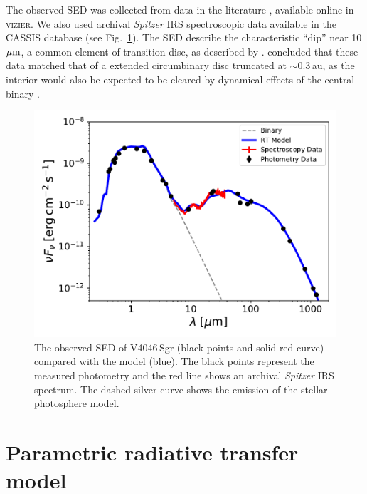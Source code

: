 \documentclass[fleqn,usenatbib,useAMS]{mnras}
\begin{document}
The observed SED was collected from data in the literature \citep{1988iras....7.....H, 1990A&A...234..230H, Jensen_97, 2000A&A...355L..27H, 2001KFNT...17..409K, 2003yCat.2246....0C, 2007PASJ...59S.369M, 2008PASP..120.1128O, 2010A&A...514A...1I, 2012yCat.2311....0C}, available online in \textsc{vizier}. We also used archival \textit{Spitzer} IRS spectroscopic data available in the CASSIS database \citep{Lebouteiller_2015} (see Fig.~\ref{fig:SED}). The SED describe the characteristic “dip” near 10 $\hbox{$\mu$m}$, a common element of transition disc, as described by \citet{Rosenfeld_2013}. \citet{Jensen_97} concluded that these data matched that of a extended circumbinary disc truncated at $\sim$0.3\,au, as the interior would also be expected to be cleared by dynamical effects of the central binary \citep{Art_Lu}.

\begin{figure}
	\centering
	\includegraphics[width=\columnwidth]{SED_.pdf}
    \caption{The observed SED of V4046\,Sgr (black points and solid red curve) compared with the model (blue). The black points represent the measured photometry and the red line shows an archival \textit{Spitzer} IRS spectrum. The dashed silver curve shows the emission of the stellar photosphere model.}
    \label{fig:SED}
\end{figure}

\section{Parametric radiative transfer model} \label{sec:model}
\end{document}
